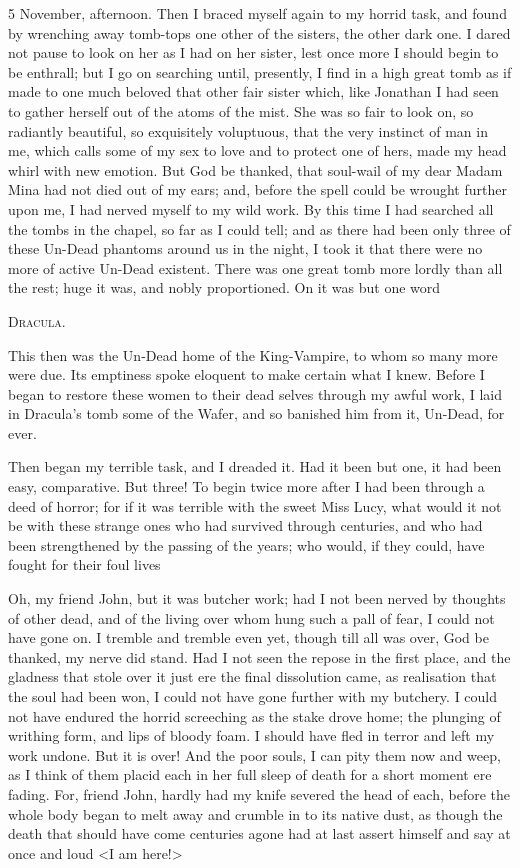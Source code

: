 \begin{diary}{5 November, afternoon.}
Then I braced myself again to my horrid task, and found by wrenching away tomb-tops one other of the sisters, the other dark one. I dared not pause to look on her as I had on her sister, lest once more I should begin to be enthrall; but I go on searching until, presently, I find in a high great tomb as if made to one much beloved that other fair sister which, like Jonathan I had seen to gather herself out of the atoms of the mist. She was so fair to look on, so radiantly beautiful, so exquisitely voluptuous, that the very instinct of man in me, which calls some of my sex to love and to protect one of hers, made my head whirl with new emotion. But God be thanked, that soul-wail of my dear Madam Mina had not died out of my ears; and, before the spell could be wrought further upon me, I had nerved myself to my wild work. By this time I had searched all the tombs in the chapel, so far as I could tell; and as there had been only three of these Un-Dead phantoms around us in the night, I took it that there were no more of active Un-Dead existent. There was one great tomb more lordly than all the rest; huge it was, and nobly proportioned. On it was but one word

\centerline{\scshape\Large Dracula.}

This then was the Un-Dead home of the King-Vampire, to whom so many more were due. Its emptiness spoke eloquent to make certain what I knew. Before I began to restore these women to their dead selves through my awful work, I laid in Dracula's tomb some of the Wafer, and so banished him from it, Un-Dead, for ever.

Then began my terrible task, and I dreaded it. Had it been but one, it had been easy, comparative. But three! To begin twice more after I had been through a deed of horror; for if it was terrible with the sweet Miss Lucy, what would it not be with these strange ones who had survived through centuries, and who had been strengthened by the passing of the years; who would, if they could, have fought for their foul lives

Oh, my friend John, but it was butcher work; had I not been nerved by thoughts of other dead, and of the living over whom hung such a pall of fear, I could not have gone on. I tremble and tremble even yet, though till all was over, God be thanked, my nerve did stand. Had I not seen the repose in the first place, and the gladness that stole over it just ere the final dissolution came, as realisation that the soul had been won, I could not have gone further with my butchery. I could not have endured the horrid screeching as the stake drove home; the plunging of writhing form, and lips of bloody foam. I should have fled in terror and left my work undone. But it is over! And the poor souls, I can pity them now and weep, as I think of them placid each in her full sleep of death for a short moment ere fading. For, friend John, hardly had my knife severed the head of each, before the whole body began to melt away and crumble in to its native dust, as though the death that should have come centuries agone had at last assert himself and say at once and loud <I am here!>


\end{diary}
